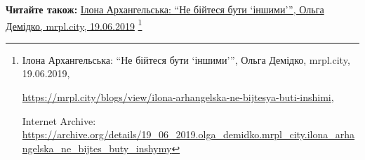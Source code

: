  
 
 
 
 

\def\pubIA{https://archive.org/details/19_06_2019.olga_demidko.mrpl_city.ilona_arhangelska_ne_bijtes_buty_inshymy}
\def\pubTitle{Ілона Архангельська: \enquote{Не бійтеся бути \enquote{іншими}}}
\def\pubDate{19.06.2019}
\def\pubOrigin{https://mrpl.city/blogs/view/ilona-arhangelska-ne-bijtesya-buti-inshimi}
\def\pubAuthor{Ольга Демідко}

\textbf{Читайте також:} \href{\pubIA}{%
\pubTitle, \pubAuthor, mrpl.city, \pubDate}%
\footnote{\pubTitle, \pubAuthor, mrpl.city, \pubDate, \par\url{\pubOrigin}, \par Internet Archive: \url{\pubIA}}
